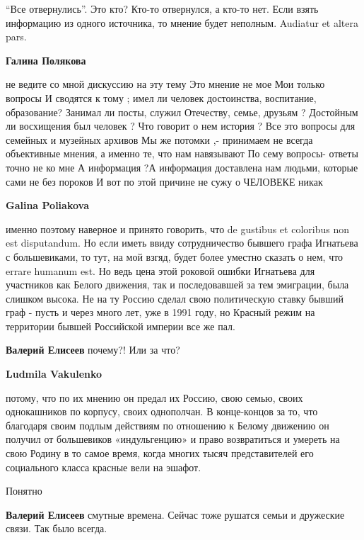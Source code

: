 \begin{itemize}
\begin{itemize}
\begin{itemize}
\enquote{Все отвернулись}. Это кто? Кто-то отвернулся, а кто-то нет. Если взять
информацию из одного источника, то мнение будет неполным. Audiatur et altera
pars.

\textbf{Галина Полякова} 

\obeycr
не ведите со мной дискуссию на эту тему
Это мнение не мое
Мои только вопросы
И сводятся к тому ; имел ли человек достоинства, воспитание, образование?
Занимал ли посты, служил Отечеству, семье, друзьям ? Достойным ли восхищения
был человек ?
Что говорит о нем история ?
Все это вопросы для семейных и музейных архивов
Мы же потомки ,- принимаем не всегда объективные мнения, а именно те, что нам навязывают
По сему вопросы- ответы точно не ко мне
А информация ?А информация доставлена нам людьми, которые сами не без пороков
И вот по этой причине не сужу о ЧЕЛОВЕКЕ никак
\restorecr

\textbf{Galina Poliakova} 

именно поэтому наверное и принято говорить, что de gustibus et coloribus non
est disputandum. Но если иметь ввиду сотрудничество бывшего графа Игнатьева с
большевиками, то тут, на мой взгяд, будет более уместно сказать о нем, что
errare humanum est. Но ведь цена этой роковой ошибки Игнатьева для участников
как Белого движения, так и последовавшей за тем эмиграции, была слишком высока.
Не на ту Россию сделал свою политическую ставку бывший граф - пусть и через
много лет, уже в 1991 году, но Красный режим на территории бывшей Российской
империи все же пал.

\end{itemize} %

\textbf{Валерий Елисеев} почему?! Или за что?

\begin{itemize} %
\textbf{Ludmila Vakulenko} 

потому, что по их мнению он предал их Россию, свою семью, своих однокашников по
корпусу, своих однополчан. В конце-концов за то, что благодаря своим подлым
действиям по отношению к Белому движению он получил от большевиков
«индульгенцию» и право возвратиться и умереть на свою Родину в то самое время,
когда многих тысяч представителей его социального класса красные вели на
эшафот.


Понятно
\end{itemize} %

\textbf{Валерий Елисеев} смутные времена. Сейчас тоже рушатся семьи и дружеские связи. Так было всегда.
\end{itemize} %


\end{itemize}
